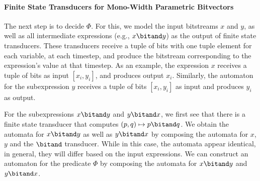 \paragraph{Finite State Transducers for Mono-Width Parametric Bitvectors}

The next step is to decide $\Phi$.
For this, we model the input bitstreams $x$ and $y$, as well as all intermediate expressions
(e.g., $x \bitand y$) as the output of finite state transducers.
These transducers receive a tuple of bits with one tuple element for each variable, at each timestep,
and produce the bitstream corresponding to the expression's value at that timestep.
As an example, the expression $x$ receives a tuple of bits as input $[x_i, y_i]$, and produces output $x_i$.
Similarly, the automaton for the subexpression $y$ receives a tuple of bits $[x_i, y_i]$ as input and produces $y_i$ as output.

For the subexpressions $x \bitand y$ and $y \bitand x$,
we first see that there is a finite state transducer that computes $(p, q)\mapsto p \bitand q$.
We obtain the automata for $x \bitand y$ as well as $y \bitand x$ by composing the automata for $x$, $y$ and the $\bitand$ transducer.
While in this case, the automata appear identical, in general, they will differ based on the input expressions.
We can construct an automaton for the predicate $\Phi$ by composing the automata for $x \bitand y$ and $y \bitand x$.



